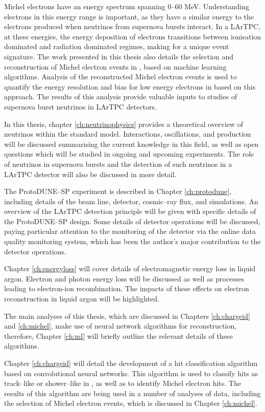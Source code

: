 Michel electrons have an energy spectrum spanning 0--60 MeV. Understanding
electrons in this energy range is important, as they have a similar energy to 
the electrons produced when neutrinos from supernova bursts interact. In a 
LArTPC, at these energies, the energy deposition of electrons transitions 
between ionisation dominated and radiation dominated regimes, making for a 
unique event signature. The work presented in this thesis also details the 
selection and reconstruction of Michel electron events in \protodune{}, based 
on machine learning algorithms. Analysis of the reconstructed Michel electron 
events is used to quantify the energy resolution and bias for low energy 
electrons in \protodune{} based on this approach. The results of this analysis 
provide valuable inputs to studies of supernova burst neutrinos in LArTPC 
detectors.

In this thesis, chapter \ref{ch:neutrinophysics} provides a theoretical 
overview of neutrinos within the standard model. Interactions, oscillations, 
and production will be discussed summarising the current knowledge in this
field, as well as open questions which will be studied in ongoing and upcoming 
experiments. The role of neutrinos in supernova bursts and the detection of 
such neutrinos in a LArTPC detector will also be discussed in more detail.

The ProtoDUNE--SP experiment is described in Chapter \ref{ch:protodune},
including details of the beam line, detector, cosmic--ray flux, and simulations.
An overview of the LArTPC detection principle will be given with specific
details of the ProtoDUNE--SP design. Some details of detector operations will be
discussed, paying particular attention to the monitoring of the detector via the
online data quality monitoring system, which has been the author's major 
contribution to the detector operations.

Chapter \ref{ch:energyloss} will cover details of electromagnetic energy loss
in liquid argon. Electron and photon energy loss will be discussed as well as
processes leading to electron-ion recombination. The impacts of these effects on
electron reconstruction in liquid argon will be highlighted.

The main analyses of this thesis, which are discussed in Chapters 
\ref{ch:chargeid} and \ref{ch:michel}, make use of neural network algorithms 
for reconstruction, therefore, Chapter \ref{ch:ml} will briefly outline the 
relevant details of these algorithms.

Chapter \ref{ch:chargeid} will detail the development of a hit classification
algorithm based on convolutional neural networks. This algorithm is used to
classify hits as track--like or shower--like in \protodune{}, as well as to 
identify Michel electron hits. The results of this algorithm are being used in a
number of analyses of \protodune{} data, including the selection of Michel
electron events, which is discussed in Chapter \ref{ch:michel}.

